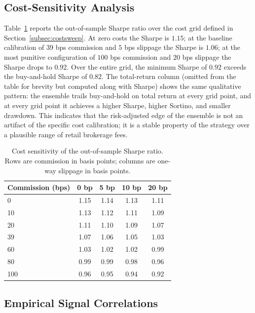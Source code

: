 \documentclass{ieeeaccess}
\newcommand{\BHsharpe}{\ensuremath{0.82}}
\newcommand{\CostZeroSharpe}{\ensuremath{1.15}}
\newcommand{\CostBaseSharpe}{\ensuremath{1.06}}
\newcommand{\CostWorstSharpe}{\ensuremath{0.92}}
\newcommand{\CostMinSharpe}{\ensuremath{0.92}}
\begin{document}
\subsection{Cost-Sensitivity Analysis}
\label{subsec:cost_sensitivity}

Table~\ref{tab:cost_sensitivity} reports the out-of-sample Sharpe ratio over the cost grid defined in Section~\ref{subsec:costsweep}. At zero costs the Sharpe is \CostZeroSharpe{}; at the baseline calibration of $39$ bps commission and $5$ bps slippage the Sharpe is \CostBaseSharpe{}; at the most punitive configuration of $100$ bps commission and $20$ bps slippage the Sharpe drops to \CostWorstSharpe{}. Over the entire grid, the minimum Sharpe of \CostMinSharpe{} exceeds the buy-and-hold Sharpe of \BHsharpe{}. The total-return column (omitted from the table for brevity but computed along with Sharpe) shows the same qualitative pattern: the ensemble trails buy-and-hold on total return at every grid point, and at every grid point it achieves a higher Sharpe, higher Sortino, and smaller drawdown. This indicates that the risk-adjusted edge of the ensemble is not an artifact of the specific cost calibration; it is a stable property of the strategy over a plausible range of retail brokerage fees.

\begin{table}[t]
\centering
\caption{Cost sensitivity of the out-of-sample Sharpe ratio. Rows are commission in basis points; columns are one-way slippage in basis points.}
\label{tab:cost_sensitivity}
\begin{tabular}{lcccc}
\toprule
Commission (bps) & 0 bp & 5 bp & 10 bp & 20 bp \\
\midrule
0 & 1.15 & 1.14 & 1.13 & 1.11 \\
10 & 1.13 & 1.12 & 1.11 & 1.09 \\
20 & 1.11 & 1.10 & 1.09 & 1.07 \\
39 & 1.07 & 1.06 & 1.05 & 1.03 \\
60 & 1.03 & 1.02 & 1.02 & 0.99 \\
80 & 0.99 & 0.99 & 0.98 & 0.96 \\
100 & 0.96 & 0.95 & 0.94 & 0.92 \\
\bottomrule
\end{tabular}
\end{table}

\subsection{Empirical Signal Correlations}
\label{subsec:correlations}
\end{document}
